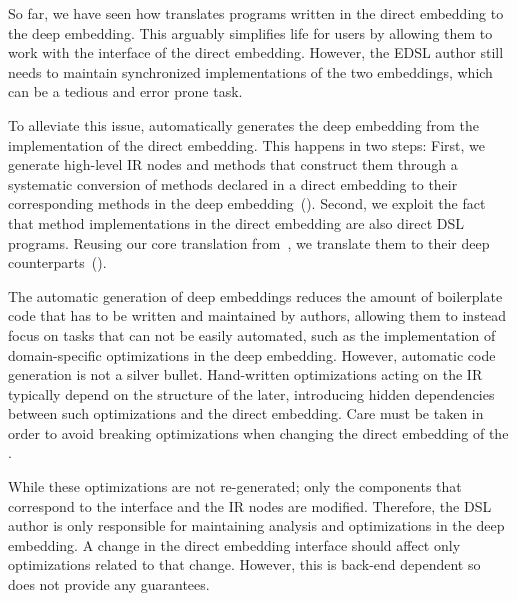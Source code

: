 So far, we have seen how \yy translates programs written in the
direct embedding to the deep embedding. This arguably simplifies life
for \edsl users by allowing them to work with the interface of the
direct embedding.  However, the EDSL author still needs to maintain synchronized
 implementations of the two embeddings, which can be a tedious and error prone task.

To alleviate this issue, \yy automatically generates the deep embedding from
the implementation of the direct embedding. This happens in two steps: First, we
generate high-level IR nodes and methods that construct them through a
systematic conversion of methods declared in a direct embedding to their
corresponding methods in the deep embedding~().
%
Second, we exploit the fact that method implementations in the direct
embedding are also direct DSL programs.  Reusing our core translation
from~, we translate them to their deep
counterparts~().



The automatic generation of deep embeddings reduces the amount of
boilerplate code that has to be written and maintained by \edsl
authors, allowing them to instead focus on tasks that can not be
easily automated, such as the implementation of domain-specific
optimizations in the deep embedding.  However, automatic code
generation is not a silver bullet.  Hand-written optimizations acting
on the IR typically depend on the structure of the later, introducing
hidden dependencies between such optimizations and the direct
embedding.  Care must be taken in order to avoid breaking
optimizations when changing the direct embedding of the \edsl.

 While these optimizations are not re-generated; only the
 components that correspond to the interface and the IR nodes are
 modified. Therefore, the DSL author is only responsible for
 maintaining analysis and optimizations in the deep embedding. A change
 in the direct embedding interface should affect only optimizations
 related to that change. However, this is back-end dependent so \yy
 does not provide any guarantees.


